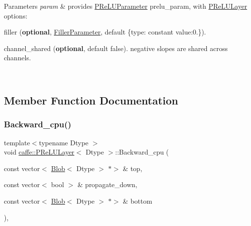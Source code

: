 \begin{DoxyParams}{Parameters}
{\em param} & provides \mbox{\hyperlink{classcaffe_1_1_p_re_l_u_parameter}{P\+Re\+L\+U\+Parameter}} prelu\+\_\+param, with \mbox{\hyperlink{classcaffe_1_1_p_re_l_u_layer}{P\+Re\+L\+U\+Layer}} options\+:
\begin{DoxyItemize}
\item filler ({\bfseries optional}, \mbox{\hyperlink{classcaffe_1_1_filler_parameter}{Filler\+Parameter}}, default \{\textquotesingle{}type\textquotesingle{}\+: constant \textquotesingle{}value\textquotesingle{}\+:0.\}).
\item channel\+\_\+shared ({\bfseries optional}, default false). negative slopes are shared across channels. 
\end{DoxyItemize}\\
\hline
\end{DoxyParams}


\subsection{Member Function Documentation}
\mbox{\label{classcaffe_1_1_p_re_l_u_layer_ab2e8ecd631bc37fdabecefbc91ee21a0}} 
\subsubsection{\texorpdfstring{Backward\+\_\+cpu()}{Backward\_cpu()}\hspace{0.1cm}{\footnotesize\ttfamily [1/2]}}
{\footnotesize\ttfamily template$<$typename Dtype $>$ \\
void \mbox{\hyperlink{classcaffe_1_1_p_re_l_u_layer}{caffe\+::\+P\+Re\+L\+U\+Layer}}$<$ Dtype $>$\+::Backward\+\_\+cpu (\begin{DoxyParamCaption}\item[{const vector$<$ \mbox{\hyperlink{classcaffe_1_1_blob}{Blob}}$<$ Dtype $>$ $\ast$$>$ \&}]{top,  }\item[{const vector$<$ bool $>$ \&}]{propagate\+\_\+down,  }\item[{const vector$<$ \mbox{\hyperlink{classcaffe_1_1_blob}{Blob}}$<$ Dtype $>$ $\ast$$>$ \&}]{bottom }\end{DoxyParamCaption})\hspace{0.3cm}{\ttfamily [protected]}, {\ttfamily [virtual]}}



